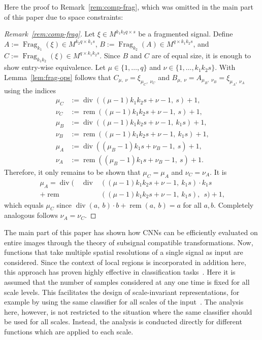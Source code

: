 \documentclass[journal]{IEEEtran}
\newcommand{\discint}[2]{\{#1,\dotsc,#2\}}
\newcommand{\inint}[2]{\in\discint{#1}{#2}}
\DeclareMathOperator{\Fragmentation}{Frag}
\renewcommand{\div}[2]{\operatorname{div}(#1,\ #2)}
\newcommand{\rem}[2]{\operatorname{rem}(#1,\ #2)}
\begin{document}
Here the proof to Remark~\ref{rem:comp-frag}, which was omitted in the main part of this paper due to space constraints:
\begin{proof}[Remark~\ref{rem:comp-frag}]
Let $\xi\in M^{k_1k_2q\times s}$ be a fragmented signal.
Define $A := \Fragmentation_{k_1}(\xi)\in M^{k_2q\times k_1 s}$, $B := \Fragmentation_{k_2}(A)\in M^{q\times k_1k_2s}$, and $C := \Fragmentation_{k_1k_2}(\xi)\in M^{q\times k_1k_2s}$.
Since $B$ and $C$ are of equal size, it is enough to show entry-wise equivalence.
Let $\mu\inint{1}{q}$ and $\nu\inint{1}{k_1k_2s}$.
With Lemma~\ref{lem:frag-ops} follows that $C_{\mu,\;\nu} = \xi_{\mu_C,\;\nu_C}$ and $B_{\mu,\;\nu} = A_{\mu_B,\;\nu_B} = \xi_{\mu_A,\;\nu_A}$ using the indices
\begin{align*}
  \mu_C &:= \div{ (\mu - 1)k_1k_2s + \nu - 1}{s} + 1\text{,}\\
  \nu_C &:= \rem{ (\mu - 1)k_1k_2s + \nu - 1}{s} + 1\text{,}\\
  \mu_B &:= \div{ (\mu - 1)k_1k_2s + \nu - 1}{k_1s} + 1\text{,}\\
  \nu_B &:= \rem{ (\mu - 1)k_1k_2s + \nu - 1}{k_1s} + 1\text{,}\\
  \mu_A &:= \div{ (\mu_B - 1)k_1s + \nu_B - 1}{s} + 1\text{,}\\
  \nu_A &:= \rem{ (\mu_B - 1)k_1s + \nu_B - 1}{s} + 1\text{.}
\end{align*}
Therefore, it only remains to be shown that $\mu_C = \mu_A$ and $\nu_C = \nu_A$.
It is
\begin{align*}
  \mu_A = \div{\phantom{+\ }   \operatorname{div}&((\mu - 1)k_1k_2s + \nu - 1,\ k_1s)\cdot k_1s\\
          + \operatorname{rem}&((\mu - 1)k_1k_2s + \nu - 1,\ k_1s)}{\ s} + 1\text{,}
\end{align*}
which equals $\mu_C$ since $\div{a}{b}\cdot b + \rem{a}{b} = a$ for all $a,b$.
Completely analogous follows $\nu_A = \nu_C$.
\end{proof}
\clearpage
{}\label{sect:multi_scale_transformations}
The main part of this paper has shown how CNNs can be efficiently evaluated on entire images through the theory of subsignal compatible transformations.
Now, functions that take multiple spatial resolutions of a single signal as input are considered.
Since the context of local regions is incorporated in addition here, this approach has proven highly effective in classification tasks~.
Here it is assumed that the number of samples considered at any one time is fixed for all scale levels.
This facilitates the design of scale-invariant representations, for example by using the same classifier for all scales of the input~.
The analysis here, however, is not restricted to the situation where the same classifier should be used for all scales.
Instead, the analysis is conducted directly for different functions which are applied to each scale.
\end{document}
